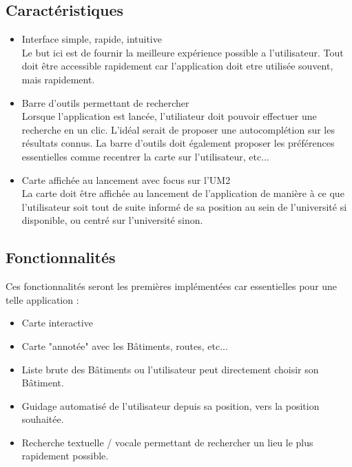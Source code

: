 \documentclass{article}
\begin{document}
	\subsection{Caractéristiques}
	\begin{itemize}
		\item Interface simple, rapide, intuitive \\
			Le but ici est de fournir la meilleure expérience possible a l'utilisateur. Tout doit être accessible rapidement car l'application doit etre utilisée souvent, mais rapidement.
		\item Barre d'outils permettant de rechercher \\
			Lorsque l'application est lancée, l'utiliateur doit pouvoir effectuer une recherche en un clic. L'idéal serait de proposer une autocomplétion sur les résultats connus. La barre d'outils doit également proposer les préférences essentielles comme recentrer la carte sur l'utilisateur, etc...
		\item Carte affichée au lancement avec focus sur l'UM2 \\
			La carte doit être affichée au lancement de l'application de manière à ce que l'utilisateur soit tout de suite informé de sa position au sein de l'université si disponible, ou centré sur l'université sinon.
	\end{itemize}

	\subsection{Fonctionnalités}
	Ces fonctionnalités seront les premières implémentées car essentielles pour une telle application :
	\begin{itemize}
		\item Carte interactive
		\item Carte "annotée" avec les Bâtiments, routes, etc...
		\item Liste brute des Bâtiments ou l'utilisateur peut directement choisir son Bâtiment.
		\item Guidage automatisé de l'utilisateur depuis sa position, vers la position souhaitée.
		\item Recherche textuelle / vocale permettant de rechercher un lieu le plus rapidement possible.
	\end{itemize}
	
\end{document}
